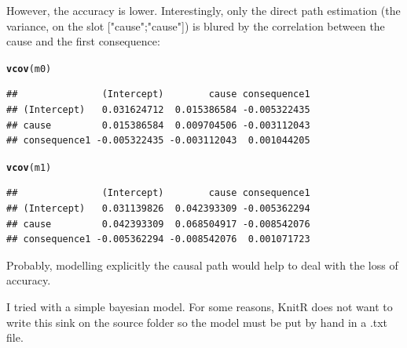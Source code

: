 \documentclass{article}\usepackage[]{graphicx}\usepackage[]{color}
\makeatletter
\newcommand{\hlstd}[1]{\textcolor[rgb]{0.345,0.345,0.345}{#1}}%
\newcommand{\hlkwd}[1]{\textcolor[rgb]{0.737,0.353,0.396}{\textbf{#1}}}%
\newenvironment{kframe}{%
 \def\at@end@of@kframe{}%
 \ifinner\ifhmode%
  \def\at@end@of@kframe{\end{minipage}}%
  \begin{minipage}{\columnwidth}%
 \fi\fi%
 \def\FrameCommand##1{\hskip\@totalleftmargin \hskip-\fboxsep
 \colorbox{shadecolor}{##1}\hskip-\fboxsep
     \hskip-\linewidth \hskip-\@totalleftmargin \hskip\columnwidth}%
 \MakeFramed {\advance\hsize-\width
   \@totalleftmargin\z@ \linewidth\hsize
   \@setminipage}}%
 {\par\unskip\endMakeFramed%
 \at@end@of@kframe}
\newenvironment{knitrout}{}{} %
\makeatother
\begin{document}
However, the accuracy is lower. Interestingly, only the direct path estimation (the variance, on the slot ["cause";"cause"]) is blured by the correlation between the cause and the first consequence:
\begin{knitrout}
\color{fgcolor}\begin{kframe}
\begin{alltt}
\hlkwd{vcov}\hlstd{(m0)}
\end{alltt}
\begin{verbatim}
##               (Intercept)        cause consequence1
## (Intercept)   0.031624712  0.015386584 -0.005322435
## cause         0.015386584  0.009704506 -0.003112043
## consequence1 -0.005322435 -0.003112043  0.001044205
\end{verbatim}
\begin{alltt}
\hlkwd{vcov}\hlstd{(m1)}
\end{alltt}
\begin{verbatim}
##               (Intercept)        cause consequence1
## (Intercept)   0.031139826  0.042393309 -0.005362294
## cause         0.042393309  0.068504917 -0.008542076
## consequence1 -0.005362294 -0.008542076  0.001071723
\end{verbatim}
\end{kframe}
\end{knitrout}

Probably, modelling explicitly the causal path would help to deal with the loss of accuracy. 


I tried with a simple bayesian model. For some reasons, KnitR does not want to write this sink on the source folder so the model must be put by hand in a .txt file. 
\end{document}
